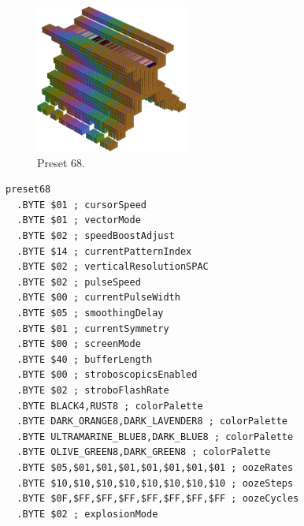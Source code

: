\vspace*{0.5cm}
\begin{minipage}[b]{0.48\linewidth}
\begin{figure}[H]                                                          
  \centering                                                             
  \begin{adjustbox}{width=5cm,center}                                   
  \includegraphics[width=5cm]{src/colorspace_presets/preset68-45.png}%
  \end{adjustbox}                                                        
\caption*{Preset 68.}                                           
\end{figure}                                                               
\end{minipage}
\hspace{0.1cm}
\begin{minipage}[b]{0.48\linewidth}                                                                         
\begin{lstlisting}[basicstyle=\ttfamily\tiny]
preset68
  .BYTE $01 ; cursorSpeed
  .BYTE $01 ; vectorMode
  .BYTE $02 ; speedBoostAdjust
  .BYTE $14 ; currentPatternIndex
  .BYTE $02 ; verticalResolutionSPAC
  .BYTE $02 ; pulseSpeed
  .BYTE $00 ; currentPulseWidth
  .BYTE $05 ; smoothingDelay
  .BYTE $01 ; currentSymmetry
  .BYTE $00 ; screenMode
  .BYTE $40 ; bufferLength
  .BYTE $00 ; stroboscopicsEnabled
  .BYTE $02 ; stroboFlashRate
  .BYTE BLACK4,RUST8 ; colorPalette
  .BYTE DARK_ORANGE8,DARK_LAVENDER8 ; colorPalette
  .BYTE ULTRAMARINE_BLUE8,DARK_BLUE8 ; colorPalette
  .BYTE OLIVE_GREEN8,DARK_GREEN8 ; colorPalette
  .BYTE $05,$01,$01,$01,$01,$01,$01,$01 ; oozeRates
  .BYTE $10,$10,$10,$10,$10,$10,$10,$10 ; oozeSteps
  .BYTE $0F,$FF,$FF,$FF,$FF,$FF,$FF,$FF ; oozeCycles
  .BYTE $02 ; explosionMode
\end{lstlisting}
\end{minipage}


